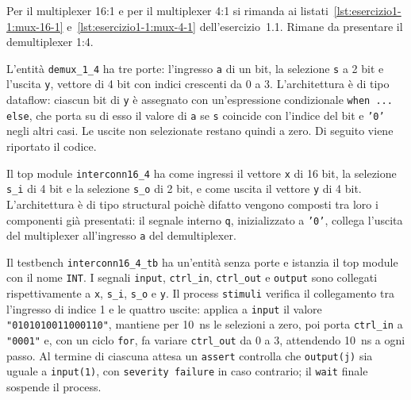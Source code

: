 \implementazione

Per il multiplexer 16:1 e per il multiplexer 4:1 si rimanda ai listati~\ref{lst:esercizio1-1:mux-16-1} e~\ref{lst:esercizio1-1:mux-4-1} dell'esercizio~1.1. Rimane da presentare il demultiplexer 1:4.

\noindent
L'entità \texttt{demux\_1\_4} ha tre porte: l'ingresso \texttt{a} di un bit, la selezione \texttt{s} a 2 bit e l'uscita \texttt{y}, vettore di 4 bit con indici crescenti da 0 a 3. L'architettura è di tipo dataflow: ciascun bit di \texttt{y} è assegnato con un'espressione condizionale \texttt{when ... else}, che porta su di esso il valore di \texttt{a} se \texttt{s} coincide con l'indice del bit e \texttt{'0'} negli altri casi. Le uscite non selezionate restano quindi a zero. Di seguito viene riportato il codice.
\newpage


Il top module \texttt{interconn16\_4} ha come ingressi il vettore \texttt{x} di 16 bit, la selezione \texttt{s\_i} di 4 bit e la selezione \texttt{s\_o} di 2 bit, e come uscita il vettore \texttt{y} di 4 bit. L'architettura è di tipo structural poichè difatto vengono composti tra loro i componenti già presentati: il segnale interno \texttt{q}, inizializzato a \texttt{'0'}, collega l'uscita del multiplexer all'ingresso \texttt{a} del demultiplexer.


\simulazione

Il testbench \texttt{interconn16\_4\_tb} ha un'entità senza porte e istanzia il top module con il nome \texttt{INT}. I segnali \texttt{input}, \texttt{ctrl\_in}, \texttt{ctrl\_out} e \texttt{output} sono collegati rispettivamente a \texttt{x}, \texttt{s\_i}, \texttt{s\_o} e \texttt{y}. Il process \texttt{stimuli} verifica il collegamento tra l'ingresso di indice 1 e le quattro uscite: applica a \texttt{input} il valore \texttt{"0101010011000110"}, mantiene per \SI{10}{ns} le selezioni a zero, poi porta \texttt{ctrl\_in} a \texttt{"0001"} e, con un ciclo \texttt{for}, fa variare \texttt{ctrl\_out} da 0 a 3, attendendo \SI{10}{ns} a ogni passo. Al termine di ciascuna attesa un \texttt{assert} controlla che \texttt{output(j)} sia uguale a \texttt{input(1)}, con \texttt{severity failure} in caso contrario; il \texttt{wait} finale sospende il process.

